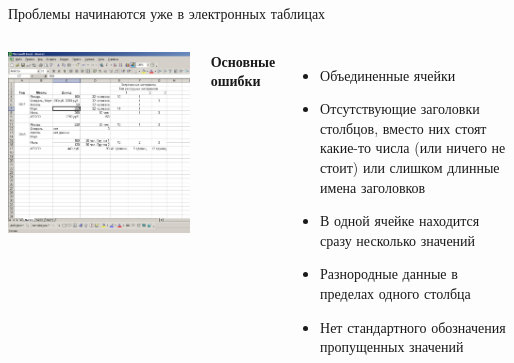 \documentclass[
  10pt,
  ignorenonframetext,
  aspectratio=169,t,xcolor=table]{beamer}
\providecommand{\tightlist}{%
  \setlength{\itemsep}{0pt}\setlength{\parskip}{0pt}}
\newcommand{\columnsbegin}{\vspace{-0.5\baselineskip}\begin{columns}[t,onlytextwidth]}
\newcommand{\columnsend}{\end{columns}}
\begin{document}
\begin{frame}{Проблемы начинаются уже в электронных таблицах}
\protect\hypertarget{ux43fux440ux43eux431ux43bux435ux43cux44b-ux43dux430ux447ux438ux43dux430ux44eux442ux441ux44f-ux443ux436ux435-ux432-ux44dux43bux435ux43aux442ux440ux43eux43dux43dux44bux445-ux442ux430ux431ux43bux438ux446ux430ux445}{}
\columnsbegin


\includegraphics[width=\textwidth, height=0.7\textheight,keepaspectratio]{images/Excel_sheet.jpg}


\textbf{Основные ошибки}

\begin{itemize}
\tightlist
\item
  Объединенные ячейки
\item
  Отсутствующие заголовки столбцов, вместо них стоят какие-то числа (или
  ничего не стоит) или слишком длинные имена заголовков
\item
  В одной ячейке находится сразу несколько значений
\item
  Разнородные данные в пределах одного столбца
\item
  Нет стандартного обозначения пропущенных значений
\end{itemize}

\columnsend
\end{frame}
\end{document}
